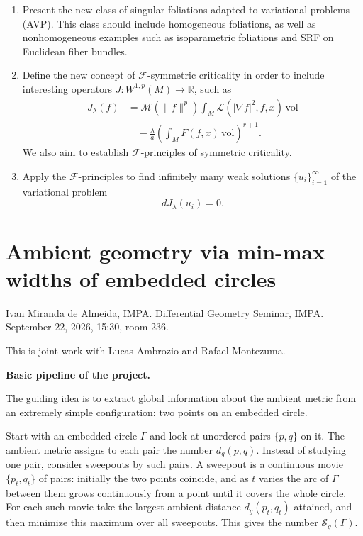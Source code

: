 \begin{enumerate}
\item[(I)] Present the new class of
singular foliations adapted to
variational problems (AVP). This class
should include homogeneous foliations,
as well as nonhomogeneous examples such
as isoparametric foliations and SRF on
Euclidean fiber bundles.

\item[(II)] Define the new concept of
$\mathcal F$-symmetric criticality in
order to include interesting operators
$J:W^{1,p}(M)\to\mathbb R$, such as
$$
\begin{aligned}
J_\lambda(f)
&=
\mathcal M(\|f\|^p)
\int_M
\mathcal L(
|\nabla f|^2,f,x)\,\mathrm{vol}
\\
&\quad
-\frac{\lambda}{a}
\left(
\int_M F(f,x)\,\mathrm{vol}
\right)^{r+1}.
\end{aligned}
$$
We also aim to establish
$\mathcal F$-principles of symmetric
criticality.

\item[(III)] Apply the
$\mathcal F$-principles to find
infinitely many weak solutions
$\{u_i\}_{i=1}^{\infty}$ of the
variational problem
$$
dJ_\lambda(u_i)=0.
$$
\end{enumerate}

\bigskip

\section{Ambient geometry via min-max
widths of embedded circles}
\label{section-ambient-circle-widths}

\noindent
Ivan Miranda de Almeida, IMPA.
Differential Geometry Seminar, IMPA.
September 22, 2026, 15:30, room 236.

\medskip\noindent
This is joint work with Lucas Ambrozio
and Rafael Montezuma.

\medskip\noindent
{\bf Basic pipeline of the project.}

The guiding idea is to extract global
information about the ambient metric from
an extremely simple configuration: two
points on an embedded circle.

Start with an embedded circle $\Gamma$ and
look at unordered pairs $\{p,q\}$ on it.
The ambient metric assigns to each pair the
number $d_g(p,q)$. Instead of studying one
pair, consider sweepouts by such pairs. A
sweepout is a continuous movie
$\{p_t,q_t\}$ of pairs: initially the two
points coincide, and as $t$ varies the arc
of $\Gamma$ between them grows continuously
from a point until it covers the whole
circle. For each such movie take the largest
ambient distance $d_g(p_t,q_t)$ attained,
and then minimize this maximum over all
sweepouts. This gives the number
$\mathcal{S}_g(\Gamma)$.


